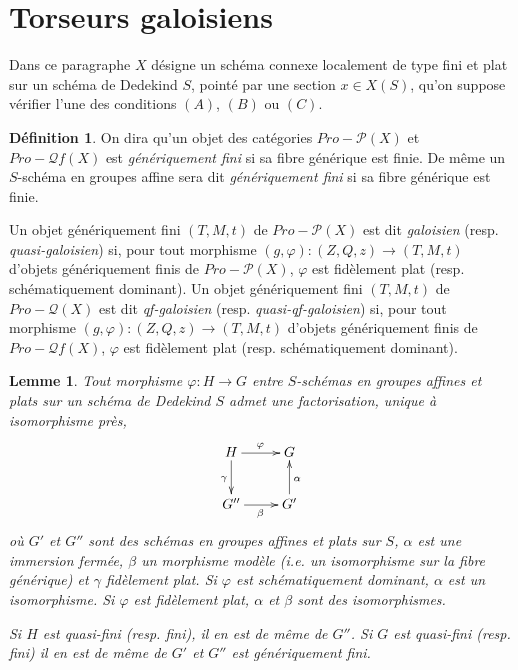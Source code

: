 \documentclass[11pt]{amsart}
\numberwithin{equation}{section}
\newtheorem{lem}[thm]{Lemme}
\theoremstyle{definition}
\newtheorem{defi}[thm]{D\'efinition}
\theoremstyle{remark}
\newcommand{\dP}{{\mathcal P}}
\newcommand{\dQ}{{\mathcal Q}}
\begin{document}
 \section{Torseurs galoisiens}\label{galoisien}
Dans ce paragraphe $X$ d\'esigne un sch\'ema connexe localement de type fini et plat sur un sch\'ema de Dedekind $S$, point\'e par une section $x \in X(S)$, qu'on suppose v\'erifier l'une des conditions $(A)$, $(B)$ ou $(C)$.

 \begin{defi}  On dira qu'un objet des cat\'egories $Pro-\dP (X)$ et $ Pro-\dQ f (X)$ est {\it g\'en\'eriquement fini} si sa fibre g\'en\'erique est finie. De m\^eme un $S$-sch\'ema en groupes affine sera dit {\it g\'en\'eriquement fini} si sa fibre g\'en\'erique est finie.

Un objet g\'en\'eriquement fini $(T,M,t)$ de $Pro-\dP (X)$ est dit {\it galoisien} (resp. {\it quasi-galoisien}) si, pour tout morphisme $(g, \varphi ) : (Z,Q,z) \to (T,M,t)$ d'objets g\'en\'eriquement finis de $Pro-\dP (X)$, $\varphi $ est fid\`element plat (resp. sch\'ematiquement dominant). Un objet g\'en\'eriquement fini $(T,M,t)$ de $Pro-\dQ (X)$ est dit {\it qf-galoisien} (resp. {\it quasi-qf-galoisien}) si, pour tout morphisme $(g, \varphi ) : (Z,Q,z) \to (T,M,t)$ d'objets g\'en\'eriquement finis de $Pro-\dQ f (X)$, $\varphi $ est fid\`element plat (resp. sch\'ematiquement dominant).
 \end{defi}

 \begin{lem}\label{factorisationHai} Tout morphisme $\varphi : H \to G$ entre $S$-sch\'emas en groupes affines et plats sur un sch\'ema de Dedekind $S$ admet une factorisation, unique \`a isomorphisme pr\`es,
 $$\xymatrix{
 H \ar[r]^\varphi \ar[d]_\gamma & G\\
 G'' \ar[r]_\beta & G' \ar[u]_\alpha \\
 }$$
 o\`u $G'$ et $G''$ sont des sch\'emas en groupes affines et plats sur $S$, $\alpha$ est une immersion ferm\'ee, $\beta$ un morphisme mod\`ele (i.e. un isomorphisme sur la fibre g\'en\'erique) et $\gamma $ fid\`element plat. Si $ \varphi $ est sch\'ematiquement dominant, $\alpha $ est un isomorphisme. Si $\varphi $ est fid\`element plat, $\alpha $ et $\beta $ sont des isomorphismes.

Si $H$ est quasi-fini (resp. fini), il en est de m\^eme de $G''$. Si $G$ est quasi-fini (resp. fini) il en est de m\^eme de $G'$ et $G''$ est g\'en\'eriquement fini.

 \end{lem}
\end{document}
